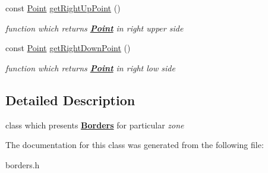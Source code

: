\begin{DoxyCompactItemize}
\mbox{\label{class_borders_af827fbc8b2adcb50f8d27e3b52eb44ee}} 
const \mbox{\hyperlink{class_point}{Point}} \mbox{\hyperlink{class_borders_af827fbc8b2adcb50f8d27e3b52eb44ee}{get\+Right\+Up\+Point}} ()
\begin{DoxyCompactList}\small\item\em {\itshape function} which returns {\bfseries{\mbox{\hyperlink{class_point}{Point}}}} in {\itshape right} {\itshape upper} {\itshape side} \end{DoxyCompactList}\item 
\mbox{\label{class_borders_af908dcbd112a36119e65e4391ec72bf0}} 
const \mbox{\hyperlink{class_point}{Point}} \mbox{\hyperlink{class_borders_af908dcbd112a36119e65e4391ec72bf0}{get\+Right\+Down\+Point}} ()
\begin{DoxyCompactList}\small\item\em {\itshape function} which returns {\bfseries{\mbox{\hyperlink{class_point}{Point}}}} in {\itshape right} {\itshape low} {\itshape side} \end{DoxyCompactList}\end{DoxyCompactItemize}


\subsection{Detailed Description}
class which presents {\bfseries{\mbox{\hyperlink{class_borders}{Borders}}}} for particular {\itshape zone} 

The documentation for this class was generated from the following file\+:\begin{DoxyCompactItemize}
\item 
borders.\+h\end{DoxyCompactItemize}
